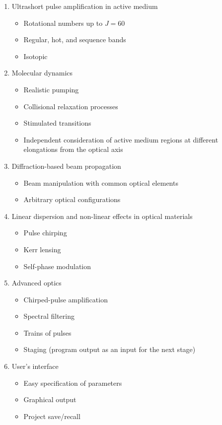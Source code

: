 \documentclass{report}
\begin{document}
\begin{enumerate}
    \item Ultrashort pulse amplification in  active medium
    \begin{itemize}
        \item Rotational numbers up to \( J = 60 \)
        \item Regular, hot, and sequence bands
        \item Isotopic 
    \end{itemize}
    \item Molecular dynamics
    \begin{itemize}
        \item Realistic pumping
        \item Collisional relaxation processes
        \item Stimulated transitions
        \item Independent consideration of active medium regions at different elongations from the optical axis
    \end{itemize}
    \item Diffraction-based beam propagation
    \begin{itemize}
        \item Beam manipulation with common optical elements
        \item Arbitrary optical configurations
    \end{itemize}
    \item Linear dispersion and non-linear effects in optical materials
    \begin{itemize}
        \item Pulse chirping
        \item Kerr lensing
        \item Self-phase modulation
    \end{itemize}
    \item Advanced optics
    \begin{itemize}
        \item Chirped-pulse amplification
        \item Spectral filtering
        \item Trains of pulses
        \item Staging (program output as an input for the next stage)
    \end{itemize}
    \item User's interface
    \begin{itemize}
        \item Easy specification of parameters
        \item Graphical output
        \item Project save/recall
    \end{itemize}
\end{enumerate}
\end{document}

